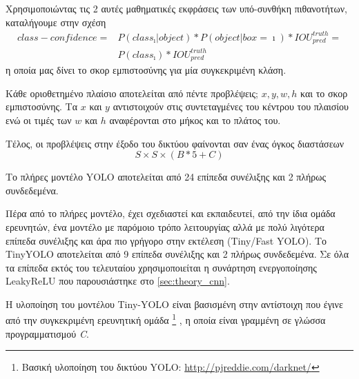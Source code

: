 Χρησιμοποιώντας τις 2 αυτές μαθηματικές εκφράσεις των υπό-συνθήκη πιθανοτήτων,
καταλήγουμε στην σχέση
\begin{equation*}
  \begin{aligned}
    class-confidence = {} & P(class_{\imath} | object) * P(object | box = \imath) * IOU_{pred}^{truth} = \\
                          & P(class_{\imath}) * IOU_{pred}^{truth}
  \end{aligned}
\end{equation*}
η οποία μας δίνει το σκορ εμπιστοσύνης για μία συγκεκριμένη κλάση.

Κάθε οριοθετημένο πλαίσιο αποτελείται από πέντε προβλέψεις; $x, y, w, h$ και
το σκορ εμπιστοσύνης. Τα $x$ και $y$ αντιστοιχούν στις συντεταγμένες του
κέντρου του πλαισίου ενώ οι τιμές των $w$ και $h$ αναφέρονται στο
μήκος και το πλάτος του.

Τέλος, οι προβλέψεις στην έξοδο του δικτύου φαίνονται σαν ένας όγκος
διαστάσεων
\begin{equation*}
  S \times S \times (B * 5 + C)
\end{equation*}

Το πλήρες μοντέλο YOLO αποτελείται από 24 επίπεδα συνέλιξης και 2 πλήρως
συνδεδεμένα.

Πέρα από το πλήρες μοντέλο, έχει σχεδιαστεί και εκπαιδευτεί, από την ίδια ομάδα ερευνητών, ένα μοντέλο
με παρόμοιο τρόπο λειτουργίας αλλά με πολύ λιγότερα επίπεδα συνέλιξης και άρα πιο
γρήγορο στην εκτέλεση (Tiny/Fast YOLO). Το TinyYOLO αποτελείται από 9 επίπεδα
συνέλιξης και 2 πλήρως συνδεδεμένα. Σε όλα τα επίπεδα εκτός του τελευταίου
χρησιμοποιείται η συνάρτηση ενεργοποίησης LeakyReLU που παρουσιάστηκε στο \autoref{sec:theory_cnn}.

Η υλοποίηση του μοντέλου Tiny-YOLO είναι βασισμένη στην αντίστοιχη
που έγινε από την συγκεκριμένη ερευνητική ομάδα \footnote{Βασική υλοποίηση του δικτύου YOLO: \url{http://pjreddie.com/darknet/}}
\cite{darknet13}, η οποία είναι γραμμένη σε γλώσσα προγραμματισμού \emph{C}.

